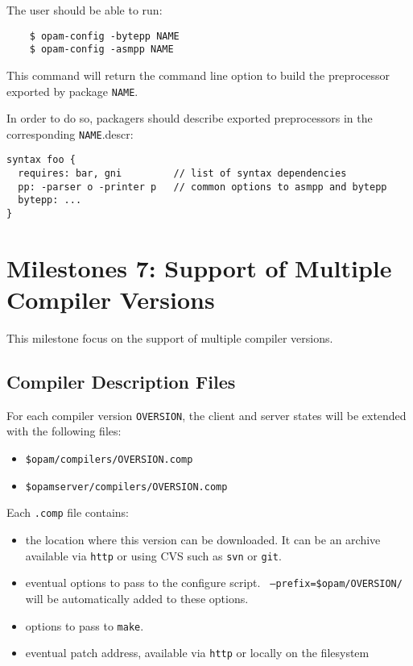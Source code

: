 \documentclass[a4paper,11pt]{article}
\begin{document}
The user should be able to run:

\begin{verbatim}
    $ opam-config -bytepp NAME
    $ opam-config -asmpp NAME
\end{verbatim}

This command will return the command line option to build the
preprocessor exported by package {\tt NAME}.

In order to do so, packagers should describe exported preprocessors in
the corresponding {\tt NAME}.descr:

\begin{verbatim}
syntax foo {
  requires: bar, gni         // list of syntax dependencies
  pp: -parser o -printer p   // common options to asmpp and bytepp
  bytepp: ...
}
\end{verbatim}

\section{Milestones 7: Support of Multiple Compiler Versions}

This milestone focus on the support of multiple compiler versions.

\subsection{Compiler Description Files}

For each compiler version {\tt OVERSION}, the client and server states
will be extended with the following files:

\begin{itemize}
\item {\tt \$opam/compilers/OVERSION.comp}
\item {\tt \$opamserver/compilers/OVERSION.comp}
\end{itemize}

Each {\tt .comp} file contains:

\begin{itemize}

\item the location where this version can be downloaded. It can be an
  archive available via {\tt http} or using CVS such as {\tt svn} or
  {\tt git}.

\item eventual options to pass to the configure script. {\tt
  --prefix=\$opam/OVERSION/} will be automatically added to these
  options.

\item options to pass to {\tt make}.

\item eventual patch address, available via {\tt http} or locally on
  the filesystem

\end{itemize}
\end{document}
